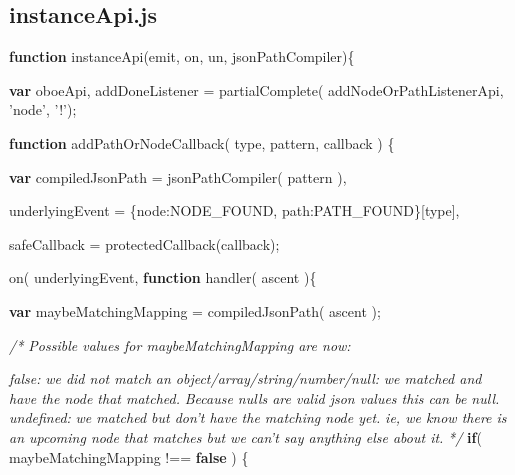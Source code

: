 \documentclass[12pt, ]{article}
\newenvironment{Shaded}{}{}
\newcommand{\KeywordTok}[1]{\textcolor[rgb]{0.00,0.44,0.13}{\textbf{{#1}}}}
\newcommand{\DataTypeTok}[1]{\textcolor[rgb]{0.56,0.13,0.00}{{#1}}}
\newcommand{\StringTok}[1]{\textcolor[rgb]{0.25,0.44,0.63}{{#1}}}
\newcommand{\CommentTok}[1]{\textcolor[rgb]{0.38,0.63,0.69}{\textit{{#1}}}}
\newcommand{\FunctionTok}[1]{\textcolor[rgb]{0.02,0.16,0.49}{{#1}}}
\newcommand{\NormalTok}[1]{{#1}}
\begin{document}
\pagebreak

\subsection{instanceApi.js}\label{headerux5finstanceApi}

\label{src_instanceApi}

\begin{Shaded}
\begin{Highlighting}[]
\KeywordTok{function} \FunctionTok{instanceApi}\NormalTok{(emit, on, un, jsonPathCompiler)\{}

   \KeywordTok{var} \NormalTok{oboeApi,}
       \NormalTok{addDoneListener = }\FunctionTok{partialComplete}\NormalTok{(}
                              \NormalTok{addNodeOrPathListenerApi, }
                              \StringTok{'node'}\NormalTok{, }\StringTok{'!'}\NormalTok{);}
                              
   \KeywordTok{function} \FunctionTok{addPathOrNodeCallback}\NormalTok{( type, pattern, callback ) \{}
   
      \KeywordTok{var} 
          \NormalTok{compiledJsonPath = }\FunctionTok{jsonPathCompiler}\NormalTok{( pattern ),}
                
          \NormalTok{underlyingEvent = \{}\DataTypeTok{node}\NormalTok{:NODE_FOUND, }\DataTypeTok{path}\NormalTok{:PATH_FOUND\}[type],}
          
          \NormalTok{safeCallback = }\FunctionTok{protectedCallback}\NormalTok{(callback);               }
          
      \FunctionTok{on}\NormalTok{( underlyingEvent, }\KeywordTok{function} \FunctionTok{handler}\NormalTok{( ascent )\{ }
 
         \KeywordTok{var} \NormalTok{maybeMatchingMapping = }\FunctionTok{compiledJsonPath}\NormalTok{( ascent );}
     
         \CommentTok{/* Possible values for maybeMatchingMapping are now:}

\CommentTok{            false: }
\CommentTok{               we did not match }
\CommentTok{  }
\CommentTok{            an object/array/string/number/null: }
\CommentTok{               we matched and have the node that matched.}
\CommentTok{               Because nulls are valid json values this can be null.}
\CommentTok{  }
\CommentTok{            undefined: }
\CommentTok{               we matched but don't have the matching node yet.}
\CommentTok{               ie, we know there is an upcoming node that matches but we }
\CommentTok{               can't say anything else about it. }
\CommentTok{         */}
         \KeywordTok{if}\NormalTok{( maybeMatchingMapping !== }\KeywordTok{false} \NormalTok{) \{                                 }


\end{Highlighting}
\end{Shaded}
\end{document}
